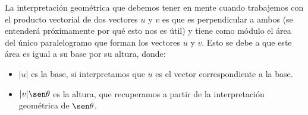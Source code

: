\noindent
La interpretación geométrica que debemos tener en mente cuando trabajemos con el producto vectorial de dos vectores $u$ y $v$ es que es perpendicular a ambos (se entenderá próximamente por qué esto nos es útil) y tiene como módulo el área del único paralelogramo que forman los vectores $u$ y $v$. Esto se debe a que este área es igual a su base por su altura, donde:
\begin{itemize}
    \item $|u|$ es la base, si interpretamos que $u$ es el vector correspondiente a la base.
    \item $|v|\sen\theta$ es la altura, que recuperamos a partir de la interpretación geométrica de $\sen\theta$.
\end{itemize}
\begin{figure}[H]
    \centering
\end{figure}

